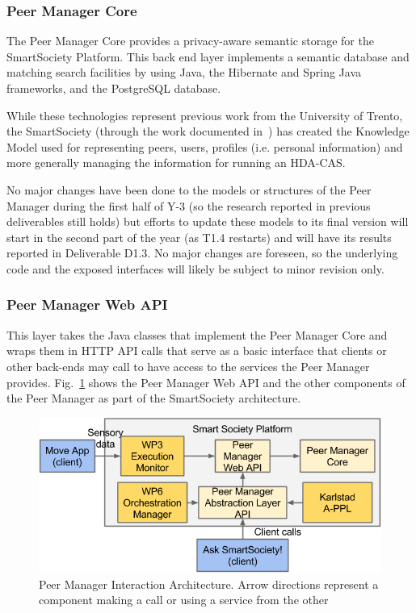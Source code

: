\subsubsection{Peer Manager Core}
The Peer Manager Core provides a privacy-aware semantic storage for the SmartSociety Platform. This back end layer implements a semantic database and matching search facilities by using Java, the Hibernate and Spring Java frameworks, and the PostgreSQL database.

While these technologies represent previous work from the University of Trento, the SmartSociety (through the work documented in~\cite{D1.1,D4.1,D4.2}) has created the Knowledge Model used for representing peers, users, profiles (i.e. personal information) and more generally managing the information for running an HDA-CAS.

No major changes have been done to the models or structures of the Peer Manager during the first half of Y-3 (so the research reported in previous deliverables still holds) but efforts to update these models to its final version will start in the second part of the year (as T1.4 restarts) and will have its results reported in Deliverable D1.3. No major changes are foreseen, so the underlying code and the exposed interfaces will likely be subject to minor revision only. 

\subsubsection{Peer Manager Web API} \label{ssec:pm-web-api}
This layer takes the Java classes that implement the Peer Manager Core and wraps them in HTTP API calls that serve as a basic interface that clients or other back-ends may call to have access to the services the Peer Manager provides. Fig.~\ref{fig:pm-interaction-arch.png} shows the Peer Manager Web API and the other components of the Peer Manager as part of the SmartSociety architecture. 

\begin{figure}[htb!]
\centering
\includegraphics[width=1\linewidth]{figures/pm-interaction-arch.png}
\caption{Peer Manager Interaction Architecture. Arrow directions represent a component making a call or using a service from the other}
\label{fig:pm-interaction-arch.png}
\end{figure}

